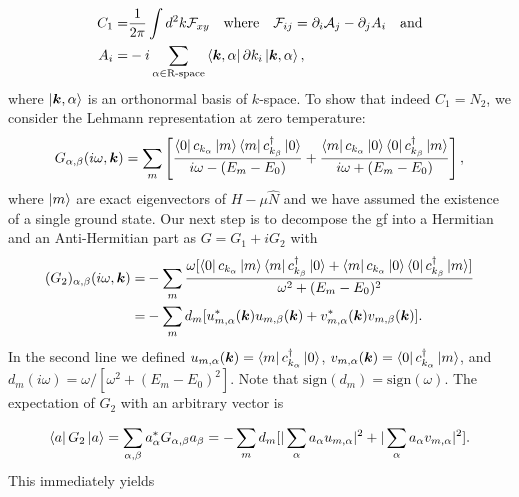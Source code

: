\documentclass[english]{scrartcl}
\begin{document}
\begin{align}
C_1 =& \frac{1}{2\pi} \int d^2 k \mathcal F_{xy} \quad \text{where} \quad \mathcal F_{ij} = \partial_i \mathcal A_j - \partial_j A_i \quad \text{and} \nonumber \\
A_i  =& -i  \sum_{\alpha \in \text{R-space}} \bra{\bm k, \alpha} \partial k_i \ket{\bm k, \alpha}, \label{Eqn:generalized_chern_number}
\end{align}
where $\ket{\bm k, \alpha}$ is an orthonormal basis of $k$-space. To show that indeed $C_1 = N_2$, we consider the Lehmann representation
at zero temperature:
\begin{align*}
G_{\alpha, \beta} (i\omega, \bm k) = \sum_{m} \left[\frac{\bra{0} c_{k_\alpha} \ket{m}\bra{m} c_{k_\beta}^\dagger \ket{0}}{i\omega - (E_m - E_0)} + \frac{\bra{m} c_{k_\alpha} \ket{0}\bra{0} c_{k_\beta}^\dagger \ket{m}}{i\omega + (E_m - E_0)}\right],
\end{align*}
where $\ket{m}$ are exact eigenvectors of $H - \mu \hat N$ and we have assumed the existence of a single ground state. Our next step is to decompose the \gls{gf} into a Hermitian and an Anti-Hermitian part as $G = G_1 + i G_2$ with  
\begin{align*}
(G_2)_{\alpha, \beta} (i\omega, \bm k) =& -\sum_{m} \frac{\omega [\bra{0} c_{k_\alpha} \ket{m}\bra{m} c_{k_\beta}^\dagger \ket{0} + \bra{m} c_{k_\alpha} \ket{0}\bra{0} c_{k_\beta}^\dagger \ket{m}]}{\omega^2 + (E_m - E_0)^2} \\
=&  -\sum_{m} d_m  [u_{m, \alpha}^* (\bm k) u_{m, \beta} (\bm k) + v_{m, \alpha}^* (\bm k) v_{m, \beta} (\bm k) ]. 
\end{align*}
In the second line we defined $u_{m, \alpha}(\bm k) = \bra{m} c_{k_\alpha}^\dagger \ket{0}$, $v_{m, \alpha}(\bm k) = \bra{0} c_{k_\alpha}^\dagger \ket{m}$, and  $d_m(i \omega) = \omega  / [\omega^2 + (E_m - E_0)^2]$. Note that $\text{sign} (d_m) = \text{sign} (\omega)$. The expectation of $G_2$ with an arbitrary vector is  

\begin{align*}
\bra{a} G_2 \ket{a} = \sum_{\alpha, \beta} a_\alpha^* G_{\alpha, \beta} a_\beta = -\sum_m d_m [|\sum_\alpha a_\alpha u_{m,\alpha}|^2 + |\sum_\alpha a_\alpha v_{m,\alpha}|^2].
\end{align*}
This immediately yields 
\end{document}
